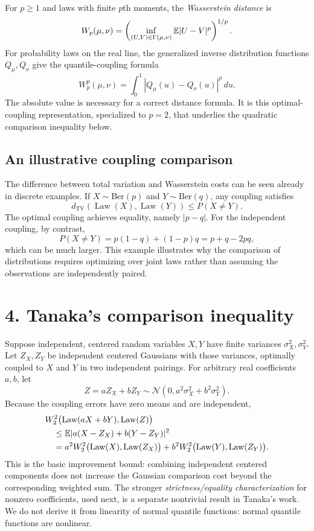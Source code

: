 \documentclass[10pt,a4paper]{article}
\newcommand{\Law}{\operatorname{Law}}\newcommand{\N}{\mathcal N}
\newcommand{\W}{W_2}
\begin{document}
For $p\ge1$ and laws with finite $p$th moments, the \emph{Wasserstein distance} is
\[
W_p(\mu,\nu)
=\left(\inf_{(U,V)\in\Gamma(\mu,\nu)}\mathbb E|U-V|^p\right)^{1/p}.
\]
For probability laws on the real line, the generalized inverse distribution functions $Q_\mu,Q_\nu$ give the quantile-coupling formula
\[
W_p^p(\mu,\nu)=\int_0^1|Q_\mu(u)-Q_\nu(u)|^p\,du.
\]
The absolute value is necessary for a correct distance formula. It is this optimal-coupling representation, specialized to $p=2$, that underlies the quadratic comparison inequality below.


\subsection*{An illustrative coupling comparison}
The difference between total variation and Wasserstein costs can be seen already in discrete examples. If $X\sim\mathrm{Ber}(p)$ and $Y\sim\mathrm{Ber}(q)$, any coupling satisfies
\[
d_{\mathrm{TV}}(\Law(X),\Law(Y))\le P(X\ne Y).
\]
The optimal coupling achieves equality, namely $|p-q|$. For the independent coupling, by contrast,
\[
P(X\ne Y)=p(1-q)+(1-p)q=p+q-2pq,
\]
which can be much larger. This example illustrates why the comparison of distributions requires optimizing over joint laws rather than assuming the observations are independently paired.

\section*{4. Tanaka's comparison inequality}
Suppose independent, centered random variables $X,Y$ have finite variances $\sigma_X^2,\sigma_Y^2$. Let $Z_X,Z_Y$ be independent centered Gaussians with those variances, optimally coupled to $X$ and $Y$ in two independent pairings. For arbitrary real coefficients $a,b$, let
\[
Z=aZ_X+bZ_Y\sim\N\left(0,a^2\sigma_X^2+b^2\sigma_Y^2\right).
\]
Because the coupling errors have zero means and are independent,
\begin{align*}
&\W^2\bigl(\Law(aX+bY),\Law(Z)\bigr)\\
&\quad\le\E|a(X-Z_X)+b(Y-Z_Y)|^2\\
&\quad=a^2\W^2\bigl(\Law(X),\Law(Z_X)\bigr)
+b^2\W^2\bigl(\Law(Y),\Law(Z_Y)\bigr).
\end{align*}
This is the basic improvement bound: combining independent centered components does not increase the Gaussian comparison cost beyond the corresponding weighted sum. The stronger \emph{strictness/equality characterization} for nonzero coefficients, used next, is a separate nontrivial result in Tanaka's work. We do not derive it from linearity of normal quantile functions: normal quantile functions are nonlinear.
\end{document}
